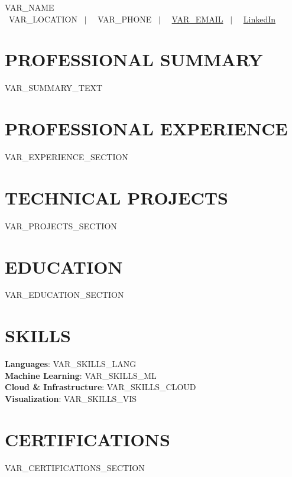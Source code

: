 \documentclass[letterpaper,10pt]{article}
\newcommand{\resumeSubHeadingListStart}{\begin{itemize}[leftmargin=0.15in, label={}]}
\newcommand{\resumeSubHeadingListEnd}{\end{itemize}}
\begin{document}
\begin{center}
    {\Huge \scshape VAR_NAME} \\ \vspace{5pt}
    \small 
    \faMapMarker* \ VAR_LOCATION \ $|$ \ 
    \faPhone \ VAR_PHONE \ $|$ \ 
    \faEnvelope \ \href{mailto:VAR_EMAIL}{VAR_EMAIL} \ $|$ \ 
    \faLinkedin \ \href{https://linkedin.com/in/bhargav-madhav}{LinkedIn}
\end{center}

\section{PROFESSIONAL SUMMARY}
\small
VAR_SUMMARY_TEXT
\vspace{-5pt}

\section{PROFESSIONAL EXPERIENCE}
\resumeSubHeadingListStart
VAR_EXPERIENCE_SECTION
\resumeSubHeadingListEnd

\section{TECHNICAL PROJECTS}
\resumeSubHeadingListStart
VAR_PROJECTS_SECTION
\resumeSubHeadingListEnd

\section{EDUCATION}
\resumeSubHeadingListStart
VAR_EDUCATION_SECTION
\resumeSubHeadingListEnd

\section{SKILLS}
\begin{itemize}[leftmargin=0.15in, label={}]
    \small{\item{
     \textbf{Languages}{: VAR_SKILLS_LANG} \\
     \textbf{Machine Learning}{: VAR_SKILLS_ML} \\
     \textbf{Cloud \& Infrastructure}{: VAR_SKILLS_CLOUD} \\
     \textbf{Visualization}{: VAR_SKILLS_VIS}
    }}
\end{itemize}

\section{CERTIFICATIONS}
\resumeSubHeadingListStart
VAR_CERTIFICATIONS_SECTION
\resumeSubHeadingListEnd
\end{document}
